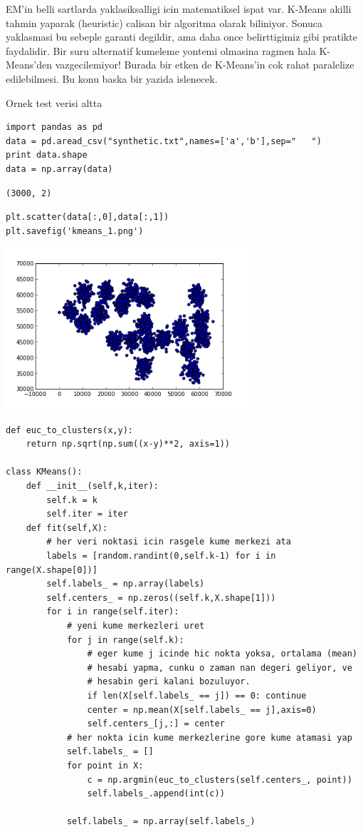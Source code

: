 \documentclass[12pt,fleqn]{article}\usepackage{../common}
\begin{document}
EM'in belli sartlarda yaklasiksalligi icin matematiksel ispat
var. K-Means akilli tahmin yaparak (heuristic) calisan bir algoritma
olarak biliniyor. Sonuca yaklasmasi bu sebeple garanti degildir, ama
daha once belirttigimiz gibi pratikte faydalidir. Bir suru alternatif
kumeleme yontemi olmasina ragmen hala K-Means'den vazgecilemiyor!
Burada bir etken de K-Means'in cok rahat paralelize edilebilmesi. Bu
konu baska bir yazida islenecek.

Ornek test verisi altta

\begin{verbatim}
import pandas as pd
data = pd.aread_csv("synthetic.txt",names=['a','b'],sep="   ")
print data.shape
data = np.array(data)
\end{verbatim}

\begin{verbatim}
(3000, 2)
\end{verbatim}

\begin{verbatim}
plt.scatter(data[:,0],data[:,1])
plt.savefig('kmeans_1.png')
\end{verbatim}

\includegraphics[height=6cm]{kmeans_1.png}
\begin{verbatim}
def euc_to_clusters(x,y):
    return np.sqrt(np.sum((x-y)**2, axis=1))

class KMeans():
    def __init__(self,k,iter):
        self.k = k
        self.iter = iter
    def fit(self,X):
        # her veri noktasi icin rasgele kume merkezi ata
        labels = [random.randint(0,self.k-1) for i in range(X.shape[0])]
        self.labels_ = np.array(labels)
        self.centers_ = np.zeros((self.k,X.shape[1]))
        for i in range(self.iter):
            # yeni kume merkezleri uret
            for j in range(self.k):
                # eger kume j icinde hic nokta yoksa, ortalama (mean)
                # hesabi yapma, cunku o zaman nan degeri geliyor, ve
                # hesabin geri kalani bozuluyor.
                if len(X[self.labels_ == j]) == 0: continue
                center = np.mean(X[self.labels_ == j],axis=0)
                self.centers_[j,:] = center
            # her nokta icin kume merkezlerine gore kume atamasi yap
            self.labels_ = []
            for point in X:
                c = np.argmin(euc_to_clusters(self.centers_, point))
                self.labels_.append(int(c))

            self.labels_ = np.array(self.labels_)
\end{verbatim}
\end{document}
